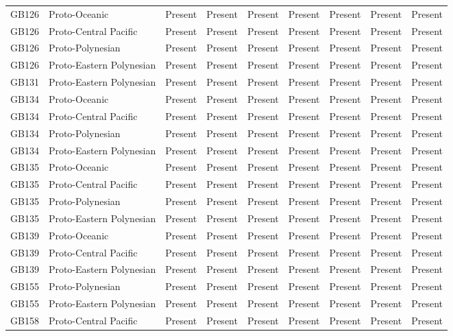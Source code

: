 \begin{longtable}{p{1.5cm}p{2.5cm}p{2.5cm}p{2.5cm}p{2.5cm}p{2.5cm}p{2.5cm}p{2.5cm}p{2.5cm}}
  GB126 & Proto-Oceanic & Present & Present & Present & Present & Present & Present & Present \\ 
  GB126 & Proto-Central Pacific & Present & Present & Present & Present & Present & Present & Present \\ 
  GB126 & Proto-Polynesian & Present & Present & Present & Present & Present & Present & Present \\ 
  GB126 & Proto-Eastern Polynesian & Present & Present & Present & Present & Present & Present & Present \\ 
  GB131 & Proto-Eastern Polynesian & Present & Present & Present & Present & Present & Present & Present \\ 
  GB134 & Proto-Oceanic & Present & Present & Present & Present & Present & Present & Present \\ 
  GB134 & Proto-Central Pacific & Present & Present & Present & Present & Present & Present & Present \\ 
  GB134 & Proto-Polynesian & Present & Present & Present & Present & Present & Present & Present \\ 
  GB134 & Proto-Eastern Polynesian & Present & Present & Present & Present & Present & Present & Present \\ 
  GB135 & Proto-Oceanic & Present & Present & Present & Present & Present & Present & Present \\ 
  GB135 & Proto-Central Pacific & Present & Present & Present & Present & Present & Present & Present \\ 
  GB135 & Proto-Polynesian & Present & Present & Present & Present & Present & Present & Present \\ 
  GB135 & Proto-Eastern Polynesian & Present & Present & Present & Present & Present & Present & Present \\ 
  GB139 & Proto-Oceanic & Present & Present & Present & Present & Present & Present & Present \\ 
  GB139 & Proto-Central Pacific & Present & Present & Present & Present & Present & Present & Present \\ 
  GB139 & Proto-Eastern Polynesian & Present & Present & Present & Present & Present & Present & Present \\ 
  GB155 & Proto-Polynesian & Present & Present & Present & Present & Present & Present & Present \\ 
  GB155 & Proto-Eastern Polynesian & Present & Present & Present & Present & Present & Present & Present \\ 
  GB158 & Proto-Central Pacific & Present & Present & Present & Present & Present & Present & Present \\ 

\end{longtable}
